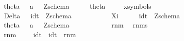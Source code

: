 \begin{isabellebody}
\ \ {\isachardoublequoteopen}{\isacharpercent}theta{\isachardoublequoteclose}\ \ {\isacharcolon}{\isacharcolon}\ {\isachardoublequoteopen}{\isacharprime}a\ \ {\isacharequal}{\isachargreater}\ Zschema{\isachardoublequoteclose}\ \ \ \ \ \ {\isacharparenleft}{\isachardoublequoteopen}{\isacharparenleft}{\isacharpercent}theta\ {\isacharunderscore}{\isacharparenright}{\isachardoublequoteclose}\ {\isacharbrackleft}{}{}{}{\isacharbrackright}{}{\isacharparenright}\isanewline
\isanewline
\ \isamarkupfalse%
\ {\isacharparenleft}xsymbols{\isacharparenright}\isanewline
\ \ {\isachardoublequoteopen}{\isacharpercent}Delta{\isachardoublequoteclose}\ \ {\isacharcolon}{\isacharcolon}\ {\isachardoublequoteopen}idt\ {\isacharequal}{\isachargreater}\ Zschema{\isachardoublequoteclose}\ \ \ \ \ \ {\isacharparenleft}{\isachardoublequoteopen}{\isacharparenleft}{\isasymDelta}\ {\isacharunderscore}{\isacharparenright}{\isachardoublequoteclose}\ {\isacharbrackleft}{}{}{}{\isacharbrackright}{}{\isacharparenright}\ \isanewline
\ \ {\isachardoublequoteopen}{\isacharpercent}Xi{\isachardoublequoteclose}\ \ \ \ \ {\isacharcolon}{\isacharcolon}\ {\isachardoublequoteopen}idt\ {\isacharequal}{\isachargreater}\ Zschema{\isachardoublequoteclose}\ \ \ \ \ \ {\isacharparenleft}{\isachardoublequoteopen}{\isacharparenleft}{\isasymXi}\ {\isacharunderscore}{\isacharparenright}{\isachardoublequoteclose}\ {\isacharbrackleft}{}{}{}{\isacharbrackright}{}{\isacharparenright}\isanewline
\ \ {\isachardoublequoteopen}{\isacharpercent}theta{\isachardoublequoteclose}\ \ {\isacharcolon}{\isacharcolon}\ {\isachardoublequoteopen}{\isacharprime}a\ \ {\isacharequal}{\isachargreater}\ Zschema{\isachardoublequoteclose}\ \ \ \ \ \ {\isacharparenleft}{\isachardoublequoteopen}{\isacharparenleft}{\isasymtheta}\ {\isacharunderscore}{\isacharparenright}{\isachardoublequoteclose}\ {\isacharbrackleft}{}{}{}{\isacharbrackright}{}{\isacharparenright}\isanewline
\isanewline
\ \isanewline
\isanewline
\isanewline
\isanewline
\isanewline
\isanewline
\isanewline
{}\isamarkupfalse%
\isanewline
\ \ rnm\isanewline
\ \ rnms\isanewline
\isanewline
\isanewline
{}\isamarkupfalse%
\isanewline
\ \ {\isachardoublequoteopen}{\isacharunderscore}rnm{\isachardoublequoteclose}\ \ \ \ {\isacharcolon}{\isacharcolon}\ {\isachardoublequoteopen}{\isacharbrackleft}idt\ {\isacharcomma}\ idt{\isacharbrackright}\ {\isacharequal}{\isachargreater}\ rnm{\isachardoublequoteclose}\ \ \ \ \ \ \ \ \ \ \ \ \ \ \ {\isacharparenleft}{\isachardoublequoteopen}{\isacharparenleft}{\isacharunderscore}\ {\isacharprime}{\isacharslash}\ {\isacharunderscore}{\isacharparenright}{\isachardoublequoteclose}\ {\isacharparenright}\isanewline

\end{isabellebody}
